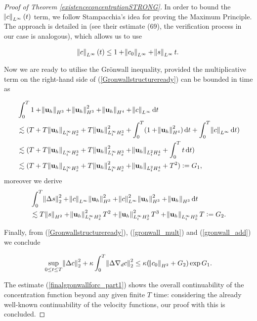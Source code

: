 \documentclass[11pt]{article}
\newcommand*\diff{\mathop{}\!\mathrm{d}}
\begin{document}
\begin{proof}[Proof of Theorem \ref{existenceconcentrationSTRONG}]
In order to bound the $\norm{c}_{L^\infty} (t)$ term, we follow Stampacchia's idea for proving the Maximum Principle. The approach is detailed in \cite{cao2012global} (see their estimate (69), the verification process in our case is analogous), which allows us to use

$$\norm{c}_{L^\infty} (t) \leq 1 + \norm{c_0}_{L^\infty} + \norm{s}_{L^\infty} t.$$

Now we are ready to utilise the Gr\"onwall inequality, provided the multiplicative term on the right-hand side of (\ref{Gronwallstructureready}) can be bounded in time as

\begin{equation} \label{gronwall_mult}
\begin{split}
& \int_0^T 1 + \norm{\mathbf{u}_h}_{H^3} + \norm{\mathbf{u}_h}_{H^3}^2 + \norm{\mathbf{u}_h}_{H^4} + \norm{c}_{L^\infty} \diff t \\
& \lesssim (T + T\norm{\mathbf{u}_h}_{L^\infty_t H^3_x} + T \norm{\mathbf{u}_h}_{L^\infty_t H^3_x}^2 + \int_0^T (1 + \norm{\mathbf{u}_h}_{H^4}^2) \diff t + \int_0^T \norm{c}_{L^\infty} \diff t )\\
& \lesssim (T + T\norm{\mathbf{u}_h}_{L^\infty_t H^3_x} + T \norm{\mathbf{u}_h}_{L^\infty_t H^3_x}^2 + \norm{\mathbf{u}_h}_{L^2_t H^4_x} + \int_0^T t \diff t )\\
& \lesssim (T + T\norm{\mathbf{u}_h}_{L^\infty_t H^3_x} + T \norm{\mathbf{u}_h}_{L^\infty_t H^3_x}^2 + \norm{\mathbf{u}_h}_{L^2_t H^4_x} + T^2) : = G_1,
\end{split}
\end{equation}
%
moreover we derive
%
\begin{equation} \label{gronwall_add}
\begin{split}
& \int_0^T \norm{\Delta s}_2^2 + \norm{c}_{L^\infty} \norm{\mathbf{u}_h}_{H^3}^2 + \norm{c}_{L^\infty}^2 \norm{\mathbf{u}_h}_{H^3}^2 + \norm{\mathbf{u}_h}_{H^3} \diff t\\
& \lesssim T \norm{s}_{H^2} + \norm{\mathbf{u}_h}_{L^\infty_t H^3_x}^2 T^2 + \norm{\mathbf{u}_h}_{L^\infty_t H^3_x}^2 T^3 + \norm{\mathbf{u}_h}_{L^\infty_t H^3_x} T := G_2.
\end{split}
\end{equation}

Finally, from (\ref{Gronwallstructureready}), (\ref{gronwall_mult}) and (\ref{gronwall_add}) we conclude

\begin{equation} \label{finalgronwallforc_part1}
\sup_{0 \leq t \leq T}\norm{\Delta c}_2^2 + \kappa \int_0^T \norm{\Delta \nabla_d c}_2^2 \leq \kappa (\norm{c_0}_{H^2} + G_2) \exp{G_1}.
\end{equation}

The estimate (\ref{finalgronwallforc_part1}) shows the overall continuability of the concentration function beyond any given finite $T$ time: considering the already well-known continuability of the velocity functions, our proof with this is concluded.

\end{proof}
\end{document}
